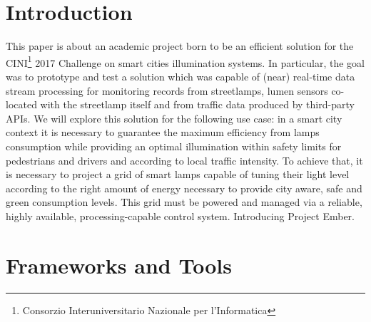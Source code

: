 \section{Introduction}
This paper is about an academic project born to be an efficient solution for the CINI\footnote{Consorzio Interuniversitario Nazionale per l'Informatica} 2017 Challenge on smart cities illumination systems. In particular, the goal was to prototype and test a solution which was capable of (near) real-time data stream processing for monitoring records from streetlamps, lumen sensors co-located with the streetlamp itself and from traffic data produced by third-party APIs. We will explore this solution for the following use case: in a smart city context it is necessary to guarantee the maximum efficiency from lamps consumption while providing an optimal illumination within safety limits for pedestrians and drivers and according to local traffic intensity. To achieve that, it is necessary to project a grid of smart lamps capable of tuning their light level according to the right amount of energy necessary to provide city aware, safe and green consumption levels. This grid must be powered and managed via a reliable, highly available, processing-capable control system. Introducing Project Ember.

\section{Frameworks and Tools}


